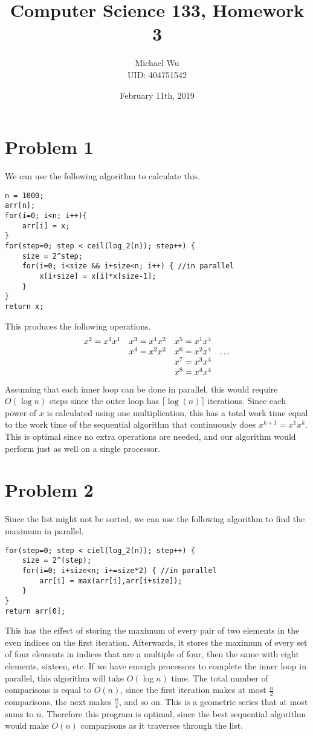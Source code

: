 \documentclass[12pt]{article}
\begin{document}
\title{Computer Science 133, Homework 3}
\date{February 11th, 2019}
\author{Michael Wu\\UID: 404751542}
\maketitle

\section*{Problem 1}

We can use the following algorithm to calculate this.
\begin{verbatim}
n = 1000;
arr[n];
for(i=0; i<n; i++){
    arr[i] = x;
}
for(step=0; step < ceil(log_2(n)); step++) {
    size = 2^step;
    for(i=0; i<size && i+size<n; i++) { //in parallel
        x[i+size] = x[i]*x[size-1];
    }
}
return x;
\end{verbatim}
This produces the following operations.
\[
    \begin{array}{c c c l}
        x^2 = x^1x^1 & x^3 = x^1x^2 & x^5 = x^1x^4 & \\
        & x^4 = x^2x^2 & x^6 = x^2x^4 & \ldots \\
        & & x^7 = x^3x^4 & \\
        & & x^8 = x^4x^4 &
    \end{array}
\]
Assuming that each inner loop can be done in parallel, this would require \(O(\log n)\) steps since the outer loop has \(\lceil\log(n)\rceil\) iterations.
Since each power of \(x\) is calculated using one multiplication, this has a total work time equal to the work time of the sequential algorithm that continuously
does \(x^{k+1}=x^1x^k\). This is optimal since no extra operations are needed, and our algorithm would perform just as well on a single processor.

\section*{Problem 2}

Since the list might not be sorted, we can use the following algorithm to find the maximum in parallel.
\begin{verbatim}
for(step=0; step < ciel(log_2(n)); step++) {
    size = 2^(step);
    for(i=0; i+size<n; i+=size*2) { //in parallel
        arr[i] = max(arr[i],arr[i+size]);
    }
}
return arr[0];
\end{verbatim}
This has the effect of storing the maximum of every pair of two elements in the even indices on the first
iteration. Afterwards, it stores the maximum of every set of four elements in indices that are a multiple of four,
then the same with eight elements, sixteen, etc. If we have enough processors to complete the inner loop
in parallel, this algorithm will take \(O(\log n)\) time. The total number of comparisons is equal to \(O(n)\),
since the first iteration makes at most \(\frac{n}{2}\) comparisons, the next makes \(\frac{n}{4}\), and so
on. This is a geometric series that at most sums to \(n\). Therefore this program is optimal, since the
best sequential algorithm would make \(O(n)\) comparisons as it traverses through the list.
\end{document}
